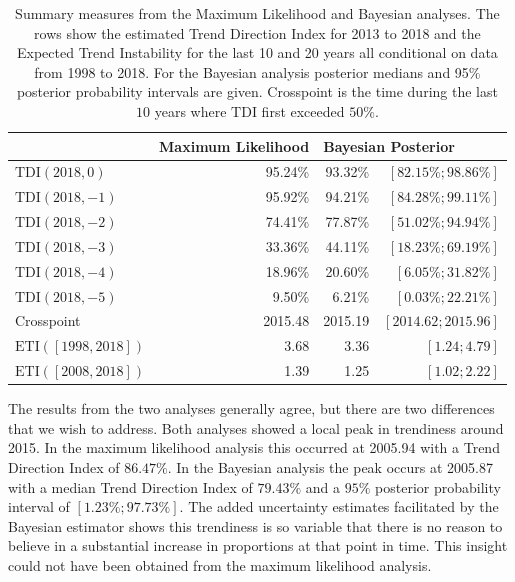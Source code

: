 \documentclass[11pt,]{article}
\theoremstyle{nonumberplain}
\begin{document}
\begin{table}[htbp]
\center
\begin{tabular}{l|rrr}
  & Maximum Likelihood & \multicolumn{2}{l}{Bayesian Posterior}\\ \hline
$\text{TDI}(2018, 0)$  & 95.24\% & 93.32\% & $[82.15\%; 98.86\%]$\\
$\text{TDI}(2018, -1)$ & 95.92\% & 94.21\% & $[84.28\%; 99.11\%]$\\
$\text{TDI}(2018, -2)$ & 74.41\% & 77.87\% & $[51.02\%; 94.94\%]$\\
$\text{TDI}(2018, -3)$ & 33.36\% & 44.11\% & $[18.23\%; 69.19\%]$\\
$\text{TDI}(2018, -4)$ & 18.96\% & 20.60\% & $[6.05\%; 31.82\%]$\\
$\text{TDI}(2018, -5)$ & 9.50\% & 6.21\% & $[0.03\%; 22.21\%]$\\ \hline
Crosspoint & 2015.48 & 2015.19 & $[2014.62; 2015.96]$\\ \hline
$\text{ETI}([1998, 2018])$ & 3.68 & 3.36 & $[1.24; 4.79]$\\
$\text{ETI}([2008, 2018])$ & 1.39 & 1.25 & $[1.02; 2.22]$
\end{tabular}
\caption{Summary measures from the Maximum Likelihood and Bayesian analyses. The rows show the estimated Trend Direction Index for 2013 to 2018 and the Expected Trend Instability for the last 10 and 20 years all conditional on data from 1998 to 2018. For the Bayesian analysis posterior medians and 95$\%$ posterior probability intervals are given. Crosspoint is the time during the last $10$ years where $\mathrm{TDI}$ first exceeded $50\%$.}
\label{tab:summaries}
\end{table}

The results from the two analyses generally agree, but there are two
differences that we wish to address. Both analyses showed a local peak
in trendiness around 2015. In the maximum likelihood analysis this
occurred at 2005.94 with a Trend Direction Index of \(86.47\%\). In the
Bayesian analysis the peak occurs at 2005.87 with a median Trend
Direction Index of \(79.43\%\) and a \(95\%\) posterior probability
interval of \([1.23\%; 97.73\%]\). The added uncertainty estimates
facilitated by the Bayesian estimator shows this trendiness is so
variable that there is no reason to believe in a substantial increase in
proportions at that point in time. This insight could not have been
obtained from the maximum likelihood analysis.
\end{document}
